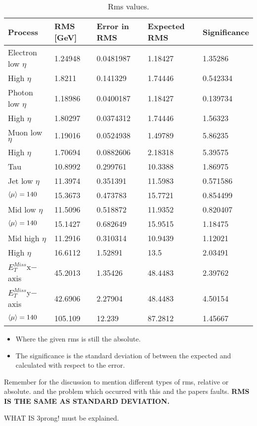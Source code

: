 \begin{table}[H]
\begin{center}
\begin{tabular}{|l|l|l|l|l|}
\hline
Process&RMS [GeV]&Error in RMS&Expected RMS& Significance\\ \hline
Electron low $\eta$&1.24948&0.0481987&1.18427&1.35286\\
High $\eta$&1.8211&0.141329&1.74446&0.542334\\ \hline
Photon low $\eta$&1.18986&0.0400187&1.18427&0.139734\\
High $\eta$&1.80297&0.0374312&1.74446&1.56323\\ \hline
Muon low $\eta$&1.19016&0.0524938&1.49789&5.86235\\
High $\eta$&1.70694&0.0882606&2.18318&5.39575\\ \hline
Tau&10.8992&0.299761&10.3388&1.86975\\ \hline
Jet low $\eta$&11.3974&0.351391&11.5983&0.571586\\
$\left<\mu\right>=140$&15.3673&0.473783&15.7721&0.854499\\
Mid low $\eta$&11.5096&0.518872&11.9352&0.820407\\
$\left<\mu\right>=140$&15.1427&0.682649&15.9515&1.18475\\
Mid high $\eta$&11.2916&0.310314&10.9439&1.12021\\
High $\eta$&16.6112&1.52891&13.5&2.03491\\ \hline
$E_T^{Miss} $x$-$axis&45.2013&1.35426&48.4483&2.39762\\ \hline
$E_T^{Miss} $y$-$axis&42.6906&2.27904&48.4483&4.50154\\ 
$\left<\mu\right>=140$&105.109&12.239&87.2812&1.45667\\  \hline
\end{tabular}
\end{center}
\caption{Rms values.}
\label{tab:rmsval}
\end{table}
\begin{itemize}
\item Where the given rms is still the absolute. 
\item The significance is the standard deviation of between the expected and calculated with respect to the error.
\end{itemize}
Remember for the discussion to mention different types of rms, relative or absolute. and the problem which occurred with this and the papers faults. \textbf{RMS IS THE SAME AS STANDARD DEVIATION.}

WHAT IS 3prong! must be explained.

